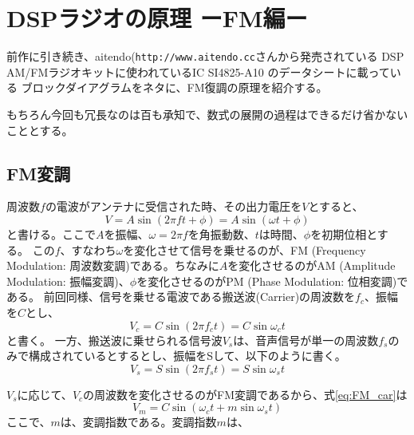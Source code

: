 \chapter*{DSPラジオの原理 ーFM編ー}
前作に引き続き、aitendo(\texttt{http://www.aitendo.cc}さんから発売されている
DSP AM/FMラジオキットに使われているIC SI4825-A10 のデータシートに載っている
ブロックダイアグラムをネタに、FM復調の原理を紹介する。

もちろん今回も冗長なのは百も承知で、数式の展開の過程はできるだけ省かないこととする。

\section*{FM変調}
周波数$f$の電波がアンテナに受信された時、その出力電圧を$V$とすると、
\begin{equation}
V = A\sin(2 \pi f t + \phi) = A\sin(\omega t + \phi)
\end{equation}
と書ける。ここで$A$を振幅、$\omega=2\pi f$を角振動数、$t$は時間、$\phi$を初期位相とす
る。
この$f$、すなわち$\omega$を変化させて信号を乗せるのが、FM (Frequency Modulation: 周波数変調)である。ちなみに$A$を変化させるのがAM (Amplitude Modulation: 振幅変調)、$\phi$を変化させるのがPM (Phase Modulation: 位相変調)である。
前回同様、信号を乗せる電波である搬送波(Carrier)の周波数を$f_c$、振幅を$C$とし、
\begin{equation}
V_c = C\sin(2 \pi f_c t) = C\sin\omega_c t \label{eq:FM_car}
\end{equation}
と書く。
一方、搬送波に乗せられる信号波$V_s$は、音声信号が単一の周波数$f_s$のみで構成されているとするとし、振幅をSして、以下のように書く。
\begin{equation}
V_s = S\sin(2 \pi f_s t) = S\sin\omega_s t \label{eq:FM_sig}
\end{equation}

$V_s$に応じて、$V_c$の周波数を変化させるのがFM変調であるから、式\ref{eq:FM_car}は
\begin{equation}
V_m = C\sin(\omega_c t + m\sin\omega_st)
\end{equation}
ここで、$m$は、変調指数である。変調指数$m$は、
